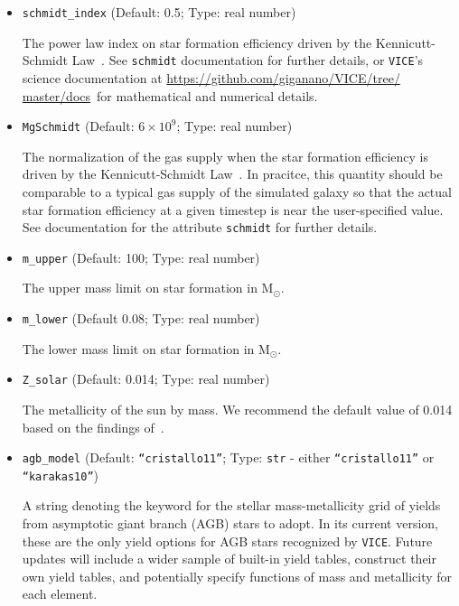 \documentclass{report}
\newcommand{\docsdir}{\url{https://github.com/giganano/VICE/tree/
master/docs}}
\begin{document}
\begin{itemize}
	\item{ %
		\texttt{schmidt\_index} (Default: 0.5; Type: real number) 
		\par
		The power law index on star formation efficiency driven by the 
		Kennicutt-Schmidt Law~\citep{Schmidt1959,Leroy2008}. See 
		\texttt{schmidt} documentation for further details, or \texttt{VICE}'s 
		science documentation at \docsdir~for mathematical and numerical 
		details. 
	}

	\item{ %
		\texttt{MgSchmidt} (Default: $6\times10^9$; Type: real number) 
		\par
		The normalization of the gas supply when the star formation efficiency 
		is driven by the Kennicutt-Schmidt Law~\citep{Schmidt1959,Leroy2008}. 
		In pracitce, this quantity should be comparable to a typical gas 
		supply of the simulated galaxy so that the actual star formation 
		efficiency at a given timestep is near the user-specified value. See 
		documentation for the attribute \texttt{schmidt} for further details. 
	}

	\item{ %
		\texttt{m\_upper} (Default: 100; Type: real number) 
		\par
		The upper mass limit on star formation in M$_\odot$. 
	}

	\item{ %
		\texttt{m\_lower} (Default 0.08; Type: real number) 
		\par 
		The lower mass limit on star formation in M$_\odot$. 
	}

	\item{ %
		\texttt{Z\_solar} (Default: 0.014; Type: real number) 
		\par
		The metallicity of the sun by mass. We recommend the default value of 
		0.014 based on the findings of~\citet{Asplund2009}. 
	}

	\item{ %
		\texttt{agb\_model} (Default: \texttt{``cristallo11''}; Type: 
		\texttt{str} - either \texttt{``cristallo11''} or 
		\texttt{``karakas10''}) 
		\par 
		A string denoting the keyword for the stellar mass-metallicity grid of 
		yields from asymptotic giant branch (AGB) stars to adopt. In its 
		current version, these are the only yield options for AGB stars 
		recognized by \texttt{VICE}. Future updates will include a wider 
		sample of built-in yield tables, construct their own yield tables, 
		and potentially specify functions of mass and metallicity for each 
		element. 
	}

\end{itemize}
\end{document}
